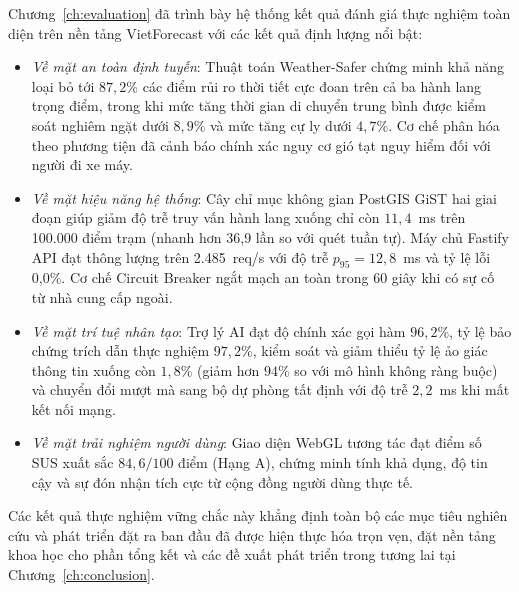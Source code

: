 Chương~\ref{ch:evaluation} đã trình bày hệ thống kết quả đánh giá thực nghiệm toàn diện trên nền tảng VietForecast với các kết quả định lượng nổi bật:
\begin{itemize}
    \item[-] \textit{Về mặt an toàn định tuyến}: Thuật toán Weather-Safer chứng minh khả năng loại bỏ tới $87,2\%$ các điểm rủi ro thời tiết cực đoan trên cả ba hành lang trọng điểm, trong khi mức tăng thời gian di chuyển trung bình được kiểm soát nghiêm ngặt dưới $8,9\%$ và mức tăng cự ly dưới $4,7\%$. Cơ chế phân hóa theo phương tiện đã cảnh báo chính xác nguy cơ gió tạt nguy hiểm đối với người đi xe máy.
    \item[-] \textit{Về mặt hiệu năng hệ thống}: Cây chỉ mục không gian PostGIS GiST hai giai đoạn giúp giảm độ trễ truy vấn hành lang xuống chỉ còn $11,4$~ms trên 100.000 điểm trạm (nhanh hơn 36,9 lần so với quét tuần tự). Máy chủ Fastify API đạt thông lượng trên 2.485~req/s với độ trễ $p_{95} = 12,8$~ms và tỷ lệ lỗi 0,0\%. Cơ chế Circuit Breaker ngắt mạch an toàn trong 60 giây khi có sự cố từ nhà cung cấp ngoài.
    \item[-] \textit{Về mặt trí tuệ nhân tạo}: Trợ lý AI đạt độ chính xác gọi hàm $96,2\%$, tỷ lệ bảo chứng trích dẫn thực nghiệm $97,2\%$, kiểm soát và giảm thiểu tỷ lệ ảo giác thông tin xuống còn $1,8\%$ (giảm hơn $94\%$ so với mô hình không ràng buộc) và chuyển đổi mượt mà sang bộ dự phòng tất định với độ trễ $2,2$~ms khi mất kết nối mạng.
    \item[-] \textit{Về mặt trải nghiệm người dùng}: Giao diện WebGL tương tác đạt điểm số SUS xuất sắc $84,6/100$ điểm (Hạng A), chứng minh tính khả dụng, độ tin cậy và sự đón nhận tích cực từ cộng đồng người dùng thực tế.
\end{itemize}

Các kết quả thực nghiệm vững chắc này khẳng định toàn bộ các mục tiêu nghiên cứu và phát triển đặt ra ban đầu đã được hiện thực hóa trọn vẹn, đặt nền tảng khoa học cho phần tổng kết và các đề xuất phát triển trong tương lai tại Chương~\ref{ch:conclusion}.
